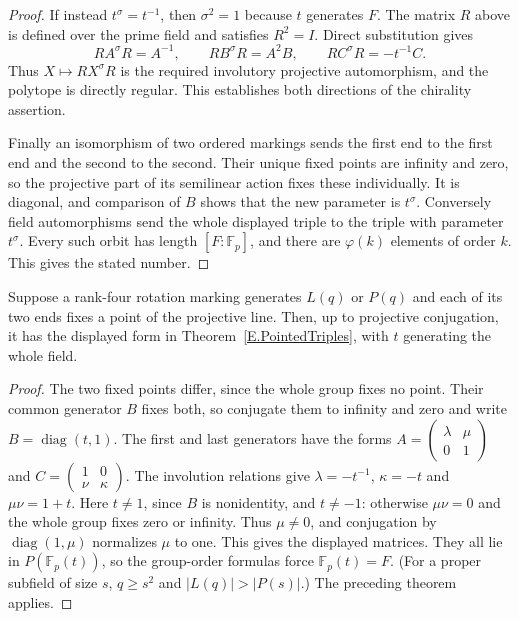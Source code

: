 \begin{proof}
If instead $t^\sigma=t^{-1}$, then $\sigma^2=1$ because $t$ generates
$F$. The matrix $R$ above is defined over the prime field and satisfies
$R^2=I$. Direct substitution gives
\[
 RA^\sigma R=A^{-1},\qquad RB^\sigma R=A^2B,
 \qquad RC^\sigma R=-t^{-1}C.
\]
Thus $X\mapsto RX^\sigma R$ is the required involutory projective
automorphism, and the polytope is directly regular. This establishes
both directions of the chirality assertion.

Finally an isomorphism of two ordered markings sends the first end to
the first end and the second to the second. Their unique fixed points
are infinity and zero, so the projective part of its semilinear action
fixes these individually. It is diagonal, and comparison of $B$ shows
that the new parameter is $t^\sigma$. Conversely field automorphisms
send the whole displayed triple to the triple with parameter $t^\sigma$.
Every such orbit has length $[F:\mathbb F_p]$, and there are
$\varphi(k)$ elements of order $k$. This gives the stated number.
\end{proof}

\begin{proposition}\label{E.PointedCompleteness}
Suppose a rank-four rotation marking generates $L(q)$ or $P(q)$ and each
of its two ends fixes a point of the projective line. Then, up to
projective conjugation, it has the displayed form in
Theorem~\ref{E.PointedTriples}, with $t$ generating the whole field.
\end{proposition}
\begin{proof}
The two fixed points differ, since the whole group fixes no point.
Their common generator $B$ fixes both, so conjugate them to infinity
and zero and write $B=\operatorname{diag}(t,1)$.
The first and last generators have the forms
$A=\left(\begin{smallmatrix}\lambda&\mu\\0&1\end{smallmatrix}\right)$
and $C=\left(\begin{smallmatrix}1&0\\\nu&\kappa\end{smallmatrix}\right)$.
The involution relations give $\lambda=-t^{-1}$, $\kappa=-t$ and
$\mu\nu=1+t$. Here $t\ne1$, since $B$ is nonidentity, and $t\ne-1$:
otherwise $\mu\nu=0$ and the whole group fixes zero or infinity.
Thus $\mu\ne0$, and conjugation by $\operatorname{diag}(1,\mu)$
normalizes $\mu$ to one. This gives the displayed matrices.
They all lie in $P(\mathbb F_p(t))$, so the group-order formulas force
$\mathbb F_p(t)=F$. (For a proper subfield of size $s$, $q\ge s^2$
and $|L(q)|>|P(s)|$.) The preceding theorem applies.
\end{proof}


